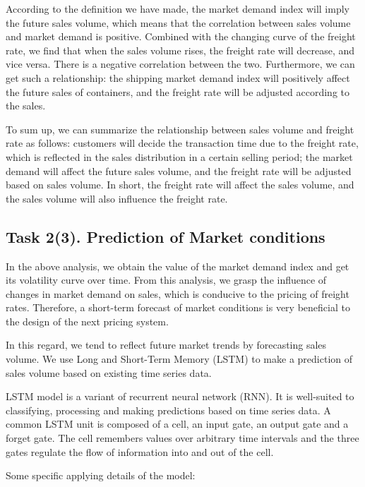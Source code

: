 According to the definition we have made, the market demand index will imply the future sales volume, which means that the correlation between sales volume and market demand is positive. Combined with the changing curve of the freight rate, we find that when the sales volume rises, the freight rate will decrease, and vice versa. There is a negative correlation between the two. Furthermore, we can get such a relationship: the shipping market demand index will positively affect the future sales of containers, and the freight rate will be adjusted according to the sales.

To sum up, we can summarize the relationship between sales volume and freight rate as follows: customers will decide the transaction time due to the freight rate, which is reflected in the sales distribution in a certain selling period; the market demand will affect the future sales volume, and the freight rate will be adjusted  based on sales volume. In short, the freight rate will affect the sales volume, and the sales volume will also influence the freight rate.

\subsection{Task 2(3). Prediction of Market conditions}
In the above analysis, we obtain the value of the market demand index and get its volatility curve over time. From this analysis, we grasp the influence of changes in market demand on sales, which is conducive to the pricing of freight rates. Therefore, a short-term forecast of market conditions is very beneficial to the design of the next pricing system.

In this regard, we tend to reflect future market trends by forecasting sales volume. We use Long and Short-Term Memory (LSTM)  to make a prediction of sales volume based on existing time series data\parencite{2016LSTM}.

LSTM model  is a variant of recurrent neural network (RNN). It is well-suited to classifying, processing and making predictions based on time series data. A common LSTM unit is composed of a cell, an input gate, an output gate and a forget gate. The cell remembers values over arbitrary time intervals and the three gates regulate the flow of information into and out of the cell\parencite{lstm1}.

Some specific applying details of the model:

